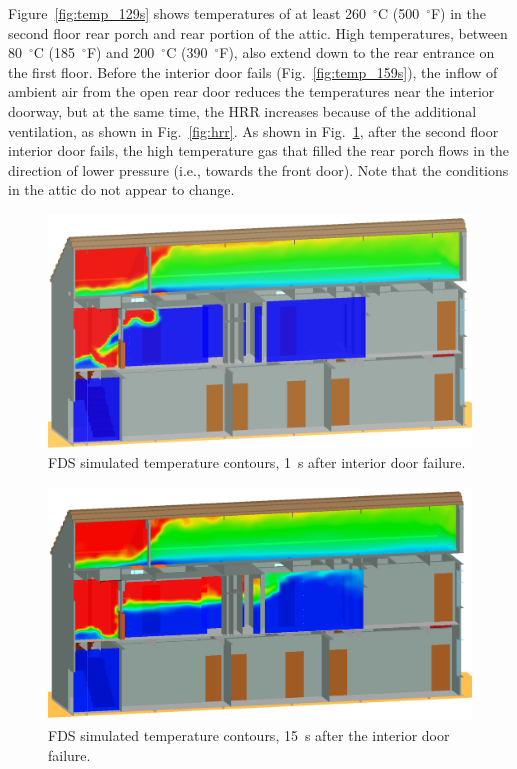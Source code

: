 \documentclass[12pt,oneside]{book}
\begin{document}
Figure~\ref{fig:temp_129s} shows temperatures of at least 260~$^{\circ}$C (500~$^{\circ}$F) in the second floor rear porch and rear portion of the attic. High temperatures, between 80~$^{\circ}$C (185~$^{\circ}$F) and 200~$^{\circ}$C (390~$^{\circ}$F), also extend down to the rear entrance on the first floor. Before the interior door fails (Fig.~\ref{fig:temp_159s}), the inflow of ambient air from the open rear door reduces the temperatures near the interior doorway, but at the same time, the HRR increases because of the additional ventilation, as shown in Fig.~\ref{fig:hrr}. As shown in Fig.~\ref{fig:temp_161s}, after the second floor interior door fails, the high temperature gas that filled the rear porch flows in the direction of lower pressure (i.e., towards the front door). Note that the conditions in the attic do not appear to change.
\begin{figure}[!ht]
\includegraphics[width=.675\textwidth]{../Figures/west_50th_baseline_161}
 

\caption{FDS simulated temperature contours, 1~s after interior door failure.}
\label{fig:temp_161s}
\end{figure}

\begin{figure}[!ht]
\includegraphics[width=.675\textwidth]{../Figures/west_50th_baseline_175}
 

\caption{FDS simulated temperature contours, 15~s after the interior door failure.}
\label{fig:temp_175s}
\end{figure}
\end{document}
